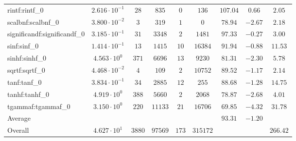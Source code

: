 \begin{tabular}{|l|c|c|c|c|c|c|c|c|}
rintf:rintf\_0               & $ 2.616 \cdot 10^{-1} $ & $ 28     $ & $ 835   $ & $ 0   $ & $ 136    $ & $ 107.04      $ & $ 0.66    $ & $ 2.05    $ \\
scalbnf:scalbnf\_0           & $ 3.800 \cdot 10^{-2} $ & $ 3      $ & $ 319   $ & $ 1   $ & $ 0      $ & $ 78.94       $ & $ -2.67   $ & $ 2.18    $ \\
significandf:significandf\_0 & $ 3.185 \cdot 10^{-1} $ & $ 31     $ & $ 3348  $ & $ 2   $ & $ 1481   $ & $ 97.33       $ & $ -0.27   $ & $ 3.00    $ \\
sinf:sinf\_0                 & $ 1.414 \cdot 10^{-1} $ & $ 13     $ & $ 1415  $ & $ 10  $ & $ 16384  $ & $ 91.94       $ & $ -0.88   $ & $ 11.53   $ \\
sinhf:sinhf\_0               & $ 4.563 \cdot 10^{0}  $ & $ 371    $ & $ 6696  $ & $ 13  $ & $ 9230   $ & $ 81.31       $ & $ -2.30   $ & $ 5.78    $ \\
sqrtf:sqrtf\_0               & $ 4.468 \cdot 10^{-2} $ & $ 4      $ & $ 109   $ & $ 2   $ & $ 10752  $ & $ 89.52       $ & $ -1.17   $ & $ 2.14    $ \\
tanf:tanf\_0                 & $ 3.834 \cdot 10^{-1} $ & $ 34     $ & $ 2885  $ & $ 12  $ & $ 255    $ & $ 88.68       $ & $ -1.28   $ & $ 14.75   $ \\
tanhf:tanhf\_0               & $ 4.919 \cdot 10^{0}  $ & $ 388    $ & $ 5660  $ & $ 2   $ & $ 2068   $ & $ 78.87       $ & $ -2.68   $ & $ 4.01    $ \\
tgammaf:tgammaf\_0           & $ 3.150 \cdot 10^{0}  $ & $ 220    $ & $ 11133 $ & $ 21  $ & $ 16706  $ & $ 69.85       $ & $ -4.32   $ & $ 31.78   $ \\
\hline
Average                      & $                     $ & $        $ & $       $ & $     $ & $        $ & $ 93.31       $ & $ -1.20   $ & $         $ \\
\hline
Overall                      & $ 4.627 \cdot 10^{1}  $ & $ 3880   $ & $ 97569 $ & $ 173 $ & $ 315172 $ & $             $ & $         $ & $ 266.42  $ \\
\hline
\end{tabular}
